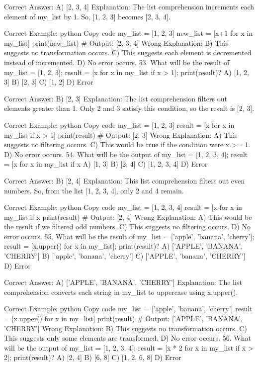 Correct Answer: A) [2, 3, 4]
Explanation: The list comprehension increments each element of my_list by 1. So, [1, 2, 3] becomes [2, 3, 4].

Correct Example:
python
Copy code
my_list = [1, 2, 3]
new_list = [x+1 for x in my_list]
print(new_list)  # Output: [2, 3, 4]
Wrong Explanation:
B) This suggests no transformation occurs.
C) This suggests each element is decremented instead of incremented.
D) No error occurs.
53. What will be the result of my_list = [1, 2, 3]; result = [x for x in my_list if x > 1]; print(result)?
A) [1, 2, 3]
B) [2, 3]
C) [1, 2]
D) Error

Correct Answer: B) [2, 3]
Explanation: The list comprehension filters out elements greater than 1. Only 2 and 3 satisfy this condition, so the result is [2, 3].

Correct Example:
python
Copy code
my_list = [1, 2, 3]
result = [x for x in my_list if x > 1]
print(result)  # Output: [2, 3]
Wrong Explanation:
A) This suggests no filtering occurs.
C) This would be true if the condition were x >= 1.
D) No error occurs.
54. What will be the output of my_list = [1, 2, 3, 4]; result = [x for x in my_list if x %
A) [1, 3]
B) [2, 4]
C) [1, 2, 3, 4]
D) Error

Correct Answer: B) [2, 4]
Explanation: This list comprehension filters out even numbers. So, from the list [1, 2, 3, 4], only 2 and 4 remain.

Correct Example:
python
Copy code
my_list = [1, 2, 3, 4]
result = [x for x in my_list if x %
print(result)  # Output: [2, 4]
Wrong Explanation:
A) This would be the result if we filtered odd numbers.
C) This suggests no filtering occurs.
D) No error occurs.
55. What will be the result of my_list = ['apple', 'banana', 'cherry']; result = [x.upper() for x in my_list]; print(result)?
A) ['APPLE', 'BANANA', 'CHERRY']
B) ['apple', 'banana', 'cherry']
C) ['APPLE', 'banana', 'CHERRY']
D) Error

Correct Answer: A) ['APPLE', 'BANANA', 'CHERRY']
Explanation: The list comprehension converts each string in my_list to uppercase using x.upper().

Correct Example:
python
Copy code
my_list = ['apple', 'banana', 'cherry']
result = [x.upper() for x in my_list]
print(result)  # Output: ['APPLE', 'BANANA', 'CHERRY']
Wrong Explanation:
B) This suggests no transformation occurs.
C) This suggests only some elements are transformed.
D) No error occurs.
56. What will be the output of my_list = [1, 2, 3, 4]; result = [x * 2 for x in my_list if x > 2]; print(result)?
A) [2, 4]
B) [6, 8]
C) [1, 2, 6, 8]
D) Error

